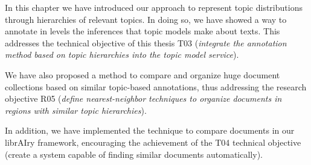 In this chapter we have introduced our approach to represent topic distributions through  hierarchies of relevant topics. In doing so, we have showed a way to annotate in levels the inferences that topic models make about texts. This addresses the technical objective of this thesis T03 (\textit{integrate the annotation method based on topic hierarchies into the topic model service}).

We have also proposed a method to compare and organize huge document collections based on similar topic-based annotations, thus addressing the research objective R05 (\textit{define nearest-neighbor techniques to organize documents in regions with similar topic hierarchies}).

In addition, we have implemented the technique to compare documents in our librAIry framework, encouraging the achievement of the T04 technical objective (create a system capable of finding similar documents automatically).